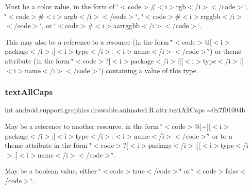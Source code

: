 Must be a color value, in the form of \char`\"{}$<$code$>$\#$<$i$>$rgb$<$/i$>$$<$/code$>$\char`\"{}, \char`\"{}$<$code$>$\#$<$i$>$argb$<$/i$>$$<$/code$>$\char`\"{}, \char`\"{}$<$code$>$\#$<$i$>$rrggbb$<$/i$>$$<$/code$>$\char`\"{}, or \char`\"{}$<$code$>$\#$<$i$>$aarrggbb$<$/i$>$$<$/code$>$\char`\"{}. 

This may also be a reference to a resource (in the form \char`\"{}$<$code$>$@\mbox{[}$<$i$>$package$<$/i$>$\+:\mbox{]}$<$i$>$type$<$/i$>$\+:$<$i$>$name$<$/i$>$$<$/code$>$\char`\"{}) or theme attribute (in the form \char`\"{}$<$code$>$?\mbox{[}$<$i$>$package$<$/i$>$\+:\mbox{]}\mbox{[}$<$i$>$type$<$/i$>$\+:\mbox{]}$<$i$>$name$<$/i$>$$<$/code$>$\char`\"{}) containing a value of this type. \mbox{\label{classandroid_1_1support_1_1graphics_1_1drawable_1_1animated_1_1R_1_1attr_aa3a0d111ce6420ea26055ef75abd7b35}} 
\subsubsection{\texorpdfstring{text\+All\+Caps}{textAllCaps}}
{\footnotesize\ttfamily int android.\+support.\+graphics.\+drawable.\+animated.\+R.\+attr.\+text\+All\+Caps =0x7f01004b\hspace{0.3cm}{\ttfamily [static]}}

May be a reference to another resource, in the form \char`\"{}$<$code$>$@\mbox{[}+\mbox{]}\mbox{[}$<$i$>$package$<$/i$>$\+:\mbox{]}$<$i$>$type$<$/i$>$\+:$<$i$>$name$<$/i$>$$<$/code$>$\char`\"{} or to a theme attribute in the form \char`\"{}$<$code$>$?\mbox{[}$<$i$>$package$<$/i$>$\+:\mbox{]}\mbox{[}$<$i$>$type$<$/i$>$\+:\mbox{]}$<$i$>$name$<$/i$>$$<$/code$>$\char`\"{}. 

May be a boolean value, either \char`\"{}$<$code$>$true$<$/code$>$\char`\"{} or \char`\"{}$<$code$>$false$<$/code$>$\char`\"{}. \mbox{\label{classandroid_1_1support_1_1graphics_1_1drawable_1_1animated_1_1R_1_1attr_ab5e31a6477223315b79de2faa28546a0}} 
